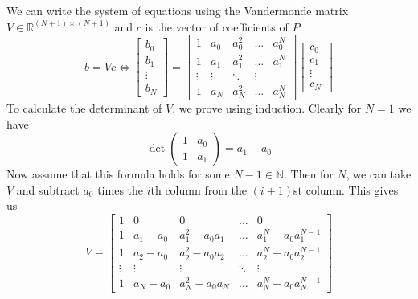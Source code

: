   \begin{solution}
    We can write the system of equations using the Vandermonde matrix $V \in \mathbb{R}^{(N+1) \times (N+1)}$ and $c$ is the vector of coefficients of $P$. 
    \begin{equation}
      b = V c \iff \begin{bmatrix}
        b_0 \\ b_1 \\ \vdots \\ b_N
      \end{bmatrix} = \begin{bmatrix}
        1 & a_0 & a_0^2 & \ldots & a_0^N \\ 
        1 & a_1 & a_1^2 & \ldots & a_1^N \\ 
        \vdots & \vdots & \ddots & \vdots \\
        1 & a_N & a_N^2 & \ldots & a_N^N 
      \end{bmatrix} \begin{bmatrix}
        c_0 \\ c_1 \\ \vdots \\ c_N
      \end{bmatrix}
    \end{equation} 
    To calculate the determinant of $V$, we prove using induction. Clearly for $N = 1$ we have 
    \begin{equation}
      \det \begin{pmatrix}
        1 & a_0 \\ 1 & a_1 
      \end{pmatrix} = a_1 - a_0
    \end{equation}
    Now assume that this formula holds for some $N-1 \in \mathbb{N}$. Then for $N$, we can take $V$ and subtract $a_0$ times the $i$th column from the $(i+1)$st column. This gives us
    \begin{equation}
      V = 
      \begin{bmatrix}
        1 & 0 & 0 & \ldots & 0 \\
        1 & a_1-a_0 & a_1^2-a_0a_1 & \ldots & a_1^N-a_0a_1^{N-1} \\
        1 & a_2-a_0 & a_2^2-a_0a_2 & \ldots & a_2^N-a_0a_2^{N-1} \\
        \vdots & \vdots & \vdots & \ddots & \vdots \\
        1 & a_N-a_0 & a_N^2-a_0a_N & \ldots & a_N^N-a_0a_N^{N-1}
      \end{bmatrix}
    \end{equation}

\end{solution}
